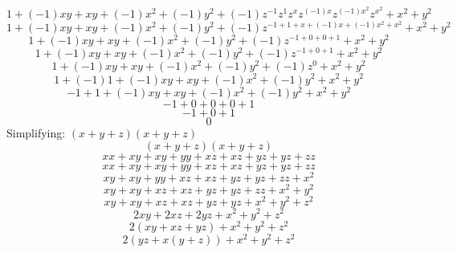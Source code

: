 \documentclass[10pt]{article}
\begin{document}
$$1 + (-1)xy + xy + (-1)x^{2} + (-1)y^{2} + (-1)z^{-1}z^{1}z^{x}z^{(-1)x}z^{(-1)x^{2}}z^{x^{2}} + x^{2} + y^{2}$$
$$1 + (-1)xy + xy + (-1)x^{2} + (-1)y^{2} + (-1)z^{-1 + 1 + x + (-1)x + (-1)x^{2} + x^{2}} + x^{2} + y^{2}$$
$$1 + (-1)xy + xy + (-1)x^{2} + (-1)y^{2} + (-1)z^{-1 + 0 + 0 + 1} + x^{2} + y^{2}$$
$$1 + (-1)xy + xy + (-1)x^{2} + (-1)y^{2} + (-1)z^{-1 + 0 + 1} + x^{2} + y^{2}$$
$$1 + (-1)xy + xy + (-1)x^{2} + (-1)y^{2} + (-1)z^{0} + x^{2} + y^{2}$$
$$1 + (-1)1 + (-1)xy + xy + (-1)x^{2} + (-1)y^{2} + x^{2} + y^{2}$$
$$-1 + 1 + (-1)xy + xy + (-1)x^{2} + (-1)y^{2} + x^{2} + y^{2}$$
$$-1 + 0 + 0 + 0 + 1$$
$$-1 + 0 + 1$$
$$0$$
Simplifying: $(x + y + z)(x + y + z)$
$$(x + y + z)(x + y + z)$$
$$xx + xy + xy + yy + xz + xz + yz + yz + zz$$
$$xx + xy + xy + yy + xz + xz + yz + yz + zz$$
$$xy + xy + yy + xz + xz + yz + yz + zz + x^{2}$$
$$xy + xy + xz + xz + yz + yz + zz + x^{2} + y^{2}$$
$$xy + xy + xz + xz + yz + yz + x^{2} + y^{2} + z^{2}$$
$$2xy + 2xz + 2yz + x^{2} + y^{2} + z^{2}$$
$$2(xy + xz + yz) + x^{2} + y^{2} + z^{2}$$
$$2(yz + x(y + z)) + x^{2} + y^{2} + z^{2}$$
\end{document}
